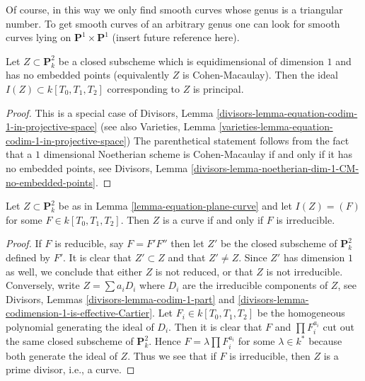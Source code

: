 \medskip\noindent
Of course, in this way we only find smooth curves whose genus
is a triangular number. To get smooth curves of an arbitrary
genus one can look for smooth curves lying on
$\mathbf{P}^1 \times \mathbf{P}^1$ (insert future reference here).

\begin{lemma}
\label{lemma-equation-plane-curve}
Let $Z \subset \mathbf{P}^2_k$ be a closed subscheme which
is equidimensional of dimension $1$ and has no embedded points
(equivalently $Z$ is Cohen-Macaulay).
Then the ideal $I(Z) \subset k[T_0, T_1, T_2]$ corresponding
to $Z$ is principal.
\end{lemma}

\begin{proof}
This is a special case of
Divisors, Lemma \ref{divisors-lemma-equation-codim-1-in-projective-space}
(see also Varieties, Lemma
\ref{varieties-lemma-equation-codim-1-in-projective-space})
The parenthetical statement follows from the fact that a
$1$ dimensional Noetherian scheme is Cohen-Macaulay
if and only if it has no embedded points, see
Divisors, Lemma \ref{divisors-lemma-noetherian-dim-1-CM-no-embedded-points}.
\end{proof}

\begin{lemma}
\label{lemma-plane-curve}
Let $Z \subset \mathbf{P}^2_k$ be as in Lemma \ref{lemma-equation-plane-curve}
and let $I(Z) = (F)$ for some $F \in k[T_0, T_1, T_2]$.
Then $Z$ is a curve if and only if $F$ is irreducible.
\end{lemma}

\begin{proof}
If $F$ is reducible, say $F = F' F''$ then let $Z'$ be the closed subscheme
of $\mathbf{P}^2_k$ defined by $F'$. It is clear that $Z' \subset Z$
and that $Z' \not = Z$. Since $Z'$ has dimension $1$ as well, we conclude
that either $Z$ is not reduced, or that $Z$ is not irreducible.
Conversely, write $Z = \sum a_i D_i$ where $D_i$ are the irreducible
components of $Z$, see
Divisors, Lemmas \ref{divisors-lemma-codim-1-part} and
\ref{divisors-lemma-codimension-1-is-effective-Cartier}.
Let $F_i \in k[T_0, T_1, T_2]$ be the homogeneous
polynomial generating the ideal of $D_i$. Then it is clear that
$F$ and $\prod F_i^{a_i}$ cut out the same closed subscheme of
$\mathbf{P}^2_k$. Hence $F = \lambda \prod F_i^{a_i}$ for some
$\lambda \in k^*$ because both generate the ideal of $Z$.
Thus we see that if $F$ is irreducible, then $Z$ is
a prime divisor, i.e., a curve.
\end{proof}

